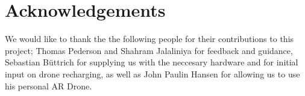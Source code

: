 \section{Acknowledgements}
We would like to thank the the following people for their contributions to this project; Thomas Pederson and Shahram Jalaliniya for feedback and guidance, Sebastian B\"uttrich for supplying us with the neccesary hardware and for initial input on drone recharging, as well as John Paulin Hansen for allowing us to use his personal AR Drone.